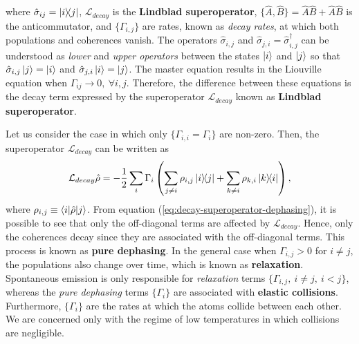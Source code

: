 where $ \hat{\sigma}_{ij} = \ketbra{i}{j} $, $ \mathcal{L}_{decay} $ is the \textbf{Lindblad superoperator}, $ \{\hat{A}, \hat{B}\} = \hat{A}\hat{B} + \hat{A}\hat{B}$ is the anticommutator, and $ \{\Gamma_{i,j}\} $ are rates, known as \textit{decay rates}, at which both populations and coherences vanish. The operators $ \hat{\sigma}_{i,j} $ and $ \hat{\sigma}_{j,i} = \hat{\sigma}_{i,j}^{\dagger} $ can be understood as \textit{lower} and \textit{upper operators} between the states $ \ket{i} $ and $ \ket{j} $ so that $ \hat{\sigma}_{i,j} \ket{j} = \ket{i} $ and $ \hat{\sigma}_{j,i} \ket{i} = \ket{j} $. The master equation results in the Liouville equation when $ \Gamma_{ij} \longrightarrow 0,\ \forall i,j $. Therefore, the difference between these equations is the decay term expressed by the superoperator $ \mathcal{L}_{decay} $ known as \textbf{Lindblad superoperator}.

Let us consider the case in which only $ \{\Gamma_{i,i} = \Gamma_i \} $ are non-zero. Then, the superoperator $ \mathcal{L}_{decay} $ can be written as
\begin{equation}
	\mathcal{L}_{decay} \hat{\rho} = - \frac{1}{2} \sum_{i} \Gamma_i \left( \sum_{j \neq i} \rho_{i,j} \ketbra{i}{j} + \sum_{k \neq i} \rho_{k,i} \ketbra{k}{i} \right),
	\label{eq:decay-superoperator-dephasing}
\end{equation}
where $ \rho_{i,j} \equiv \braket{i|\hat{\rho}|j} $. From equation (\ref{eq:decay-superoperator-dephasing}), it is possible to see that only the off-diagonal terms are affected by $ \mathcal{L}_{decay} $. Hence, only the coherences decay since they are associated with the off-diagonal terms. This process is known as \textbf{pure dephasing}. In the general case when $ \Gamma_{i,j} > 0 $ for $  i \neq j $, the populations also change over time, which is known as \textbf{relaxation}. Spontaneous emission is only responsible for \textit{relaxation} terms $ \{ \Gamma_{i,j},\ i \neq j,\ i  < j \} $, whereas the \textit{pure dephasing} terms $ \{ \Gamma_{i} \} $ are associated with \textbf{elastic collisions}. Furthermore, $\{ \Gamma_{i} \} $ are the rates at which the atoms collide between each other. We are concerned only with the regime of low temperatures in which collisions are negligible.
